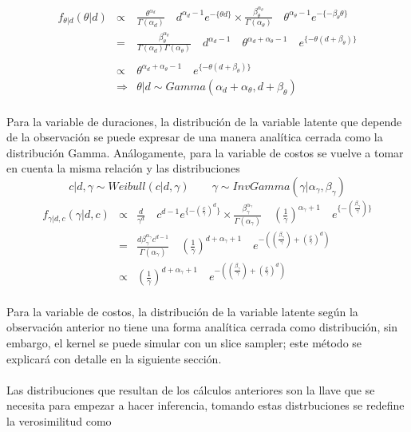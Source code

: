 \begin{eqnarray*}
f_{\theta|d}(\theta|d) &\propto& \frac{\theta^{\alpha_d}}{\Gamma(\alpha_d)}\quad d^{\alpha_d-1} e^{-\{\theta d\}} \times \frac{\beta_\theta^{\alpha_\theta}}{\Gamma(\alpha_\theta)}\quad \theta^{\alpha_\theta-1} e^{-\{-\beta_\theta \theta\}}\\
&=&\frac{\beta_\theta^{\alpha_\theta}}{\Gamma(\alpha_d)\Gamma(\alpha_\theta)} \quad d^{\alpha_d-1} \quad\theta^{\alpha_d+\alpha_\theta-1} \quad e^{\{-\theta(d+\beta_\theta)\}}\\
\\
&\propto& \theta^{\alpha_d+\alpha_\theta-1} \quad e^{\{-\theta(d+\beta_\theta)\}}\\
&\Rightarrow& \theta|d \sim Gamma(\alpha_d+\alpha_\theta,d+\beta_\theta)
\end{eqnarray*}
\\
Para la variable de duraciones, la distribuci\'on de la variable latente que depende de la observaci\'on se puede expresar de una manera anal\'itica cerrada como la distribuci\'on Gamma. An\'alogamente, para la variable de costos se vuelve a tomar en cuenta la misma relaci\'on y las distribuciones 
\[c|d,\gamma \sim Weibull(c|d,\gamma) \qquad \gamma \sim InvGamma(\gamma|\alpha_\gamma,\beta_\gamma)\]
\begin{eqnarray*}
f_{\gamma|d,c}(\gamma|d,c) &\propto& \frac{d}{\gamma^d}\quad c^{d-1} e^{\{-(\frac{c}{\gamma})^d\}} \times \frac{\beta_\gamma^{\alpha_\gamma}}{\Gamma(\alpha_\gamma)}\quad (\frac{1}{\gamma})^{\alpha_\gamma+1} \quad e^{\{-(\frac{\beta_\gamma}{\gamma})\}}\\
&=&\frac{d\beta_\gamma^{\alpha_\gamma} c^{d-1}}{\Gamma(\alpha_\gamma)}\quad (\frac{1}{\gamma})^{d+\alpha_\gamma+1}\quad e^{-((\frac{\beta_\gamma}{\gamma})+(\frac{c}{\gamma})^d)}\\
&\propto&(\frac{1}{\gamma})^{d+\alpha_\gamma+1}\quad e^{-((\frac{\beta_\gamma}{\gamma})+(\frac{c}{\gamma})^d)}
\end{eqnarray*}
\\
Para la variable de costos, la distribuci\'on de la variable latente seg\'un la observaci\'on anterior no tiene una forma anal\'itica cerrada como distribuci\'on, sin embargo, el kernel se puede simular con un slice sampler; este m\'etodo se explicar\'a con detalle en la siguiente secci\'on. \\
\\
Las distribuciones que resultan de los c\'alculos anteriores son la llave que se necesita para empezar a hacer inferencia, tomando estas distrbuciones se redefine la verosimilitud como
